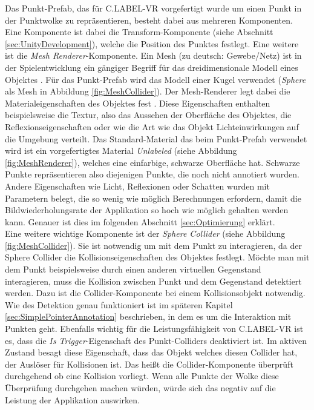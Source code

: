 Das Punkt-Prefab, das für C.LABEL-VR vorgefertigt wurde um einen Punkt in der Punktwolke zu repräsentieren, besteht dabei aus mehreren Komponenten. Eine Komponente ist dabei die Transform-Komponente (siehe Abschnitt \ref{sec:UnityDevelopment}), welche die Position des Punktes festlegt. Eine weitere ist die \textit{Mesh Renderer}-Komponente. Ein Mesh (zu deutsch: Gewebe/Netz) ist in der Spielentwicklung ein gängiger Begriff für das dreidimensionale Modell eines Objektes \cite{bib:Meshes}. Für das Punkt-Prefab wird das Modell einer Kugel verwendet (\textit{Sphere} als Mesh in Abbildung \ref{fig:MeshCollider}). Der Mesh-Renderer legt dabei die Materialeigenschaften des Objektes fest \cite{bib:MeshRenderer}. Diese Eigenschaften enthalten beispielsweise die Textur, also das Aussehen der Oberfläche des Objektes, die Reflexionseigenschaften oder wie die Art wie das Objekt Lichteinwirkungen auf die Umgebung verteilt. Das Standard-Material das beim Punkt-Prefab verwendet wird ist ein vorgefertigtes Material \textit{Unlabeled} (siehe Abbildung \ref{fig:MeshRenderer}), welches eine einfarbige, schwarze Oberfläche hat. Schwarze Punkte repräsentieren also diejenigen Punkte, die noch nicht annotiert wurden. Andere Eigenschaften wie Licht, Reflexionen oder Schatten wurden mit Parametern belegt, die so wenig wie möglich Berechnungen erfordern, damit die Bildwiederholungsrate der Applikation so hoch wie möglich gehalten werden kann. Genauer ist dies im folgenden Abschnitt \ref{sec:Optimierung} erklärt. \\

Eine weitere wichtige Komponente ist der \textit{Sphere Collider} (siehe Abbildung \ref{fig:MeshCollider}). Sie ist notwendig um mit dem Punkt zu interagieren, da der Sphere Collider die Kollisionseigenschaften des Objektes festlegt. Möchte man mit dem Punkt beispielsweise durch einen anderen virtuellen Gegenstand interagieren, muss die Kollision zwischen Punkt und dem Gegenstand detektiert werden. Dazu ist die Collider-Komponente bei einem Kollisionsobjekt notwendig. Wie des Detektion genau funktioniert ist im späteren Kapitel \ref{sec:SimplePointerAnnotation} beschrieben, in dem es um die Interaktion mit Punkten geht. Ebenfalls wichtig für die Leistungsfähigkeit von C.LABEL-VR ist es, dass die \textit{Is Trigger}-Eigenschaft des Punkt-Colliders deaktiviert ist. Im aktiven Zustand besagt diese Eigenschaft, dass das Objekt welches diesen Collider hat, der Auslöser für Kollisionen ist. Das heißt die Collider-Komponente überprüft durchgehend ob eine Kollision vorliegt. Wenn alle Punkte der Wolke diese Überprüfung durchgehen machen würden, würde sich das negativ auf die Leistung der Applikation auswirken.\\

